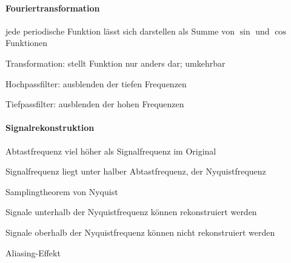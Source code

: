 \documentclass[landscape]{article}
\begin{document}
\begin{multicols}{3}
  \paragraph{Fouriertransformation}
  \begin{itemize*}
    \item jede periodische Funktion lässt sich darstellen als Summe von $\sin$ und $\cos$ Funktionen
    \item Transformation: stellt Funktion nur anders dar; umkehrbar
    \item Hochpassfilter: ausblenden der tiefen Frequenzen
    \item Tiefpassfilter: ausblenden der hohen Frequenzen
  \end{itemize*}
  
  \paragraph{Signalrekonstruktion}
  \begin{itemize*}
    \item Abtastfrequenz viel höher als Signalfrequenz im Original
    \item Signalfrequenz liegt unter halber Abtastfrequenz, der Nyquistfrequenz
    \item Samplingtheorem von Nyquist
    \begin{itemize*}
      \item Signale unterhalb der Nyquistfrequenz können rekonstruiert werden
      \item Signale oberhalb der Nyquistfrequenz können nicht rekonstruiert werden
      \item Aliasing-Effekt
    \end{itemize*}
  \end{itemize*}
  

\end{multicols}
\end{document}
